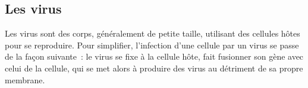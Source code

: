 \subsection{Les virus}

Les virus sont des corps, généralement de petite taille, utilisant des
cellules hôtes pour se reproduire. Pour simplifier, l'infection d'une
cellule par un virus se passe de la façon suivante~: le virus se fixe
à la cellule hôte, fait fusionner son gène avec celui de la cellule,
qui se met alors à produire des virus au détriment de sa propre
membrane.
